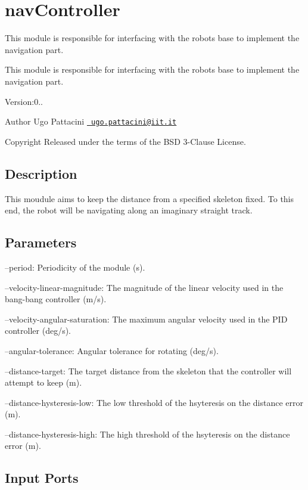 \section{nav\+Controller}
\label{group__navController}


This module is responsible for interfacing with the robot\textquotesingle{}s base to implement the navigation part.  


This module is responsible for interfacing with the robot\textquotesingle{}s base to implement the navigation part. 

Version\+:0.. \begin{DoxyAuthor}{Author}
Ugo Pattacini \href{mailto:ugo.pattacini@iit.it}{\texttt{ ugo.\+pattacini@iit.\+it}} ~\newline
 
\end{DoxyAuthor}
\begin{DoxyCopyright}{Copyright}
Released under the terms of the B\+SD 3-\/Clause License. 
\end{DoxyCopyright}
\hypertarget{group__skeletonViewer_intro_sec}{}\subsection{Description}\label{group__skeletonViewer_intro_sec}
This moudule aims to keep the distance from a specified skeleton fixed. To this end, the robot will be navigating along an imaginary straight track.\hypertarget{group__skeletonViewer_parameters_sec}{}\subsection{Parameters}\label{group__skeletonViewer_parameters_sec}

\begin{DoxyItemize}
\item --period\+: Periodicity of the module (s).
\item --velocity-\/linear-\/magnitude\+: The magnitude of the linear velocity used in the bang-\/bang controller (m/s).
\item --velocity-\/angular-\/saturation\+: The maximum angular velocity used in the P\+ID controller (deg/s).
\item --angular-\/tolerance\+: Angular tolerance for rotating (deg/s).
\item --distance-\/target\+: The target distance from the skeleton that the controller will attempt to keep (m).
\item --distance-\/hysteresis-\/low\+: The low threshold of the hsyteresis on the distance error (m).
\item --distance-\/hysteresis-\/high\+: The high threshold of the hsyteresis on the distance error (m). 
\end{DoxyItemize}\hypertarget{group__skeletonViewer_inputports_sec}{}\subsection{Input Ports}\label{group__skeletonViewer_inputports_sec}


